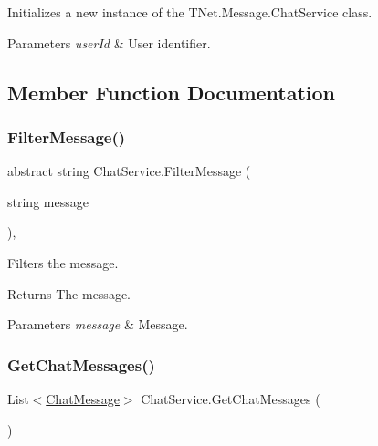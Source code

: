 Initializes a new instance of the T\+Net.\+Message.\+Chat\+Service class. 


\begin{DoxyParams}{Parameters}
{\em user\+Id} & User identifier.\\
\hline
\end{DoxyParams}


\subsection{Member Function Documentation}
\mbox{\label{class_chat_service_a110f921d7a54356b2cb357d241af37fb}} 
\subsubsection{\texorpdfstring{Filter\+Message()}{FilterMessage()}}
{\footnotesize\ttfamily abstract string Chat\+Service.\+Filter\+Message (\begin{DoxyParamCaption}\item[{string}]{message }\end{DoxyParamCaption})\hspace{0.3cm}{\ttfamily [protected]}, {}}



Filters the message. 

\begin{DoxyReturn}{Returns}
The message.
\end{DoxyReturn}

\begin{DoxyParams}{Parameters}
{\em message} & Message.\\
\hline
\end{DoxyParams}
\mbox{\label{class_chat_service_aae1d333e18b5b7b6528fadde15a9181d}} 
\subsubsection{\texorpdfstring{Get\+Chat\+Messages()}{GetChatMessages()}}
{\footnotesize\ttfamily List$<$\mbox{\hyperlink{class_t_net_1_1_model_1_1_chat_message}{Chat\+Message}}$>$ Chat\+Service.\+Get\+Chat\+Messages (\begin{DoxyParamCaption}{ }\end{DoxyParamCaption})\hspace{0.3cm}{\ttfamily [protected]}}



